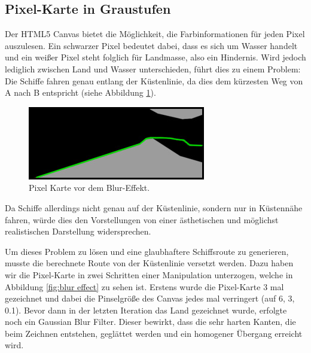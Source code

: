 \documentclass[letterpaper]{article}
\begin{document}
	\subsection{Pixel-Karte in Graustufen}
		Der HTML5 Canvas bietet die Möglichkeit, die Farbinformationen für jeden Pixel auszulesen. Ein schwarzer Pixel bedeutet dabei, dass es sich um Wasser handelt und ein weißer Pixel steht folglich für Landmasse, also ein Hindernis. Wird jedoch lediglich zwischen Land und Wasser unterschieden, führt dies zu einem Problem: Die Schiffe fahren genau entlang der Küstenlinie, da dies dem kürzesten Weg von A nach B entspricht (siehe Abbildung \ref{fig:route before blur}).

		\begin{figure}[!htbp]
			\centering
			\includegraphics[width=.7\linewidth]{route_before_blur}
			\caption[]{Pixel Karte vor dem Blur-Effekt.\footnotemark}
			\label{fig:route before blur}
		\end{figure}

		Da Schiffe allerdings nicht genau auf der Küstenlinie, sondern nur in Küstennähe fahren, würde dies den Vorstellungen von einer ästhetischen und möglichst realistischen Darstellung widersprechen. 

		Um dieses Problem zu lösen und eine glaubhaftere Schiffsroute zu generieren, musste die berechnete Route von der Küstenlinie versetzt werden. Dazu haben wir die Pixel-Karte in zwei Schritten einer Manipulation unterzogen, welche in Abbildung \ref{fig:blur effect} zu sehen ist.  Erstens wurde die Pixel-Karte 3 mal gezeichnet und dabei die Pinselgröße des Canvas jedes mal verringert (auf 6, 3, 0.1). Bevor dann in der letzten Iteration das Land gezeichnet wurde, erfolgte noch ein Gaussian Blur Filter\cite{vigour17}. Dieser bewirkt, dass die sehr harten Kanten, die beim Zeichnen entstehen, geglättet werden und ein homogener Übergang erreicht wird.
\end{document}
